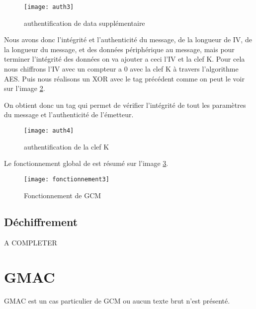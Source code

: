 \begin{figure}[!h]
  \centering
  \texttt{[image: auth3]}
  \caption{authentification de data supplémentaire}
  \label{auth3}
\end{figure}



Nous avons donc l'intégrité et l'authenticité du message, de la longueur de IV, de la longueur du message, et des données périphérique au message, mais pour terminer l'intégrité des données on va ajouter a ceci l'IV et la clef K. %
Pour cela nous chiffrons l'IV avec un compteur a 0 avec la clef K à travers l'algorithme AES. Puis nous réalisons un XOR avec le tag précédent comme on peut le voir sur l'image \ref{auth4}.

On obtient donc un tag qui permet de vérifier l'intégrité de tout les paramètres du message et l'authenticité de l'émetteur.

\begin{figure}[!h]
  \centering
  \texttt{[image: auth4]}
  \caption{authentification de la clef K}
  \label{auth4}
\end{figure}


Le fonctionnement global de \aes est résumé sur l'image \ref{Fonctionnement de GCM}.


\begin{figure}[!h]
  \centering
  \texttt{[image: fonctionnement3]}
  \caption{Fonctionnement de GCM}
  \label{Fonctionnement de GCM}
\end{figure}


\subsection{Déchiffrement}

A COMPLETER


\section{GMAC}

GMAC est un cas particulier de GCM ou aucun texte brut n'est présenté.




